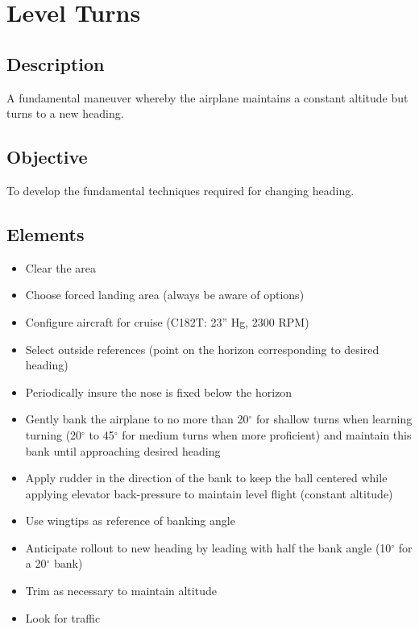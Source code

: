 \section{Level Turns}

\subsection{Description}

A fundamental maneuver whereby the airplane maintains a constant altitude but
turns to a new heading.

\subsection{Objective}

To develop the fundamental techniques required for changing heading.

\subsection{Elements}

\begin{itemize}
  \item Clear the area
  \item Choose forced landing area (always be aware of options) 
  \item Configure aircraft for cruise (C182T: 23'' Hg, 2300 RPM)
  \item Select outside references (point on the horizon corresponding to desired heading)
  \item Periodically insure the nose is fixed below the horizon
  \item Gently bank the airplane to no more than 20$^\circ$ for shallow turns
    when learning turning (20$^\circ$ to 45$^\circ$ for medium turns when more
    proficient) and maintain this bank until approaching desired heading
  \item Apply rudder in the direction of the bank to keep the ball centered
    while applying elevator back-pressure to maintain level flight (constant
    altitude)
  \item Use wingtips as reference of banking angle
  \item Anticipate rollout to new heading by leading with half the bank angle
    (10$^\circ$ for a 20$^\circ$ bank)
  \item Trim as necessary to maintain altitude 
  \item Look for traffic
\end{itemize}

